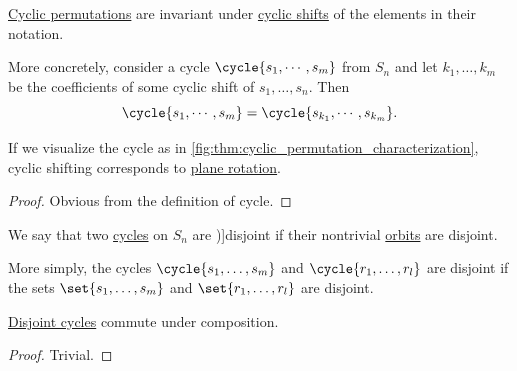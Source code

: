 \begin{proposition}\label{thm:cyclic_permutation_cyclic_shift}
  \hyperref[def:cyclic_permutation]{Cyclic permutations} are invariant under \hyperref[def:cyclic_shift]{cyclic shifts} of the elements in their notation.

  More concretely, consider a cycle \( \cycle{ s_1, \cdots, s_m } \) from \( S_n \) and let \( k_1, \ldots, k_m \) be the coefficients of some cyclic shift of \( s_1, \ldots, s_n \). Then
  \begin{equation*}
    \cycle{ s_1, \cdots, s_m } = \cycle{ s_{k_1}, \cdots, s_{k_m} }.
  \end{equation*}
\end{proposition}
\begin{comments}
  \item If we visualize the cycle as in \cref{fig:thm:cyclic_permutation_characterization}, cyclic shifting corresponds to \hyperref[def:rigid_motion/rotation]{plane rotation}.
\end{comments}
\begin{proof}
  Obvious from the definition of cycle.
\end{proof}

\begin{definition}\label{def:disjoint_cycle}
  We say that two \hyperref[def:cyclic_permutation]{cycles} on \( S_n \) are \term[ru=независимые (\cite[sec. 4.3]{Тыртышников2007ЛинейнаяАлгебра})]{disjoint} if their nontrivial \hyperref[def:group_action_orbit]{orbits} are disjoint.
\end{definition}
\begin{comments}
  \item More simply, the cycles \( \cycle{ s_1, \ldots, s_m } \) and \( \cycle{ r_1, \ldots, r_l } \) are disjoint if the sets \( \set{ s_1, \ldots, s_m } \) and \( \set{ r_1, \ldots, r_l } \) are disjoint.
\end{comments}

\begin{proposition}\label{thm:disjoint_cycles_commute}
  \hyperref[def:disjoint_cycle]{Disjoint cycles} commute under composition.
\end{proposition}
\begin{proof}
  Trivial.
\end{proof}

